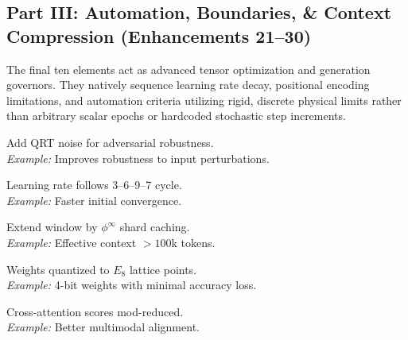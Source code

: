 \subsection{Part III\@: Automation, Boundaries, \& Context Compression (Enhancements 21--30)}

The final ten elements act as advanced tensor optimization and generation governors. They natively sequence learning rate decay, positional encoding limitations, and automation criteria utilizing rigid, discrete physical limits rather than arbitrary scalar epochs or hardcoded stochastic step increments.

\begin{tcolorbox}[
	enhanced,
	colback=nrccream!85!white,
	colframe=nrcblue,
	boxrule=0.5mm,
	title=\textbf{21. QRT noise injection}
	]
	Add QRT noise for adversarial robustness. \\
	\textit{Example:} Improves robustness to input perturbations.
\end{tcolorbox}

\begin{tcolorbox}[
	enhanced,
	colback=nrccream!85!white,
	colframe=nrcblue,
	boxrule=0.5mm,
	title=\textbf{22. 3--6--9--7 cycle warm-up schedule}
	]
	Learning rate follows 3--6--9--7 cycle. \\
	\textit{Example:} Faster initial convergence.
\end{tcolorbox}

\begin{tcolorbox}[
	enhanced,
	colback=nrccream!85!white,
	colframe=nrcblue,
	boxrule=0.5mm,
	title=\textbf{23. $\phi^\infty$ context window extension}
	]
	Extend window by $\phi^\infty$ shard caching. \\
	\textit{Example:} Effective context $>100$k tokens.
\end{tcolorbox}

\begin{tcolorbox}[
	enhanced,
	colback=nrccream!85!white,
	colframe=nrcblue,
	boxrule=0.5mm,
	title=\textbf{24. $E_8$ lattice quantization for weights}
	]
	Weights quantized to $E_8$ lattice points. \\
	\textit{Example:} 4-bit weights with minimal accuracy loss.
\end{tcolorbox}

\begin{tcolorbox}[
	enhanced,
	colback=nrccream!85!white,
	colframe=nrcblue,
	boxrule=0.5mm,
	title=\textbf{25. TTT cross-attention with $\phi$-mod reduction}
	]
	Cross-attention scores mod-reduced. \\
	\textit{Example:} Better multimodal alignment.
\end{tcolorbox}

